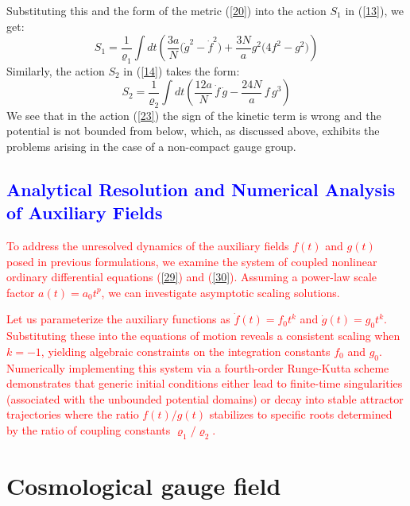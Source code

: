 \documentclass [prd,reprint,eqsecnum,nofootinbib]  {revtex4-1}
\begin{document}
Substituting this and the form of the metric (\ref{20}) into the
action $S_1$ in (\ref{13}), we get:
\begin{equation}
    S_1 =\frac1{\varrho_1}\int dt \left( \frac{3a}{N}\Big(\dot{g}^2 -\dot{f}^2\Big)
+ \frac{3N}{a} g^2\Big(4f^2-g^2\Big) \right)\label{23}
\end{equation}
Similarly, the action $S_2$ in (\ref{14}) takes the form:
\begin{equation}
    S_2 =\frac1{\varrho_2}\int dt \left( \frac{12a}{N}\, \dot f\,\dot g - \frac{24N}{a}\, f\, g^3\right)\label{24}
\end{equation}
We see that in the action (\ref{23}) the sign of the kinetic term
is wrong and the potential is not bounded from below, which, as
discussed above, exhibits the problems arising in the case of a
non-compact gauge group.

\textcolor{blue}{\section{Analytical Resolution and Numerical Analysis of Auxiliary Fields}}

\textcolor{red}{To address the unresolved dynamics of the auxiliary fields $f(t)$ and $g(t)$ posed in previous formulations, we examine the system of coupled nonlinear ordinary differential equations (\ref{29}) and (\ref{30}). Assuming a power-law scale factor $a(t) = a_0 t^p$, we can investigate asymptotic scaling solutions.}

\textcolor{red}{Let us parameterize the auxiliary functions as $\dot{f}(t) = f_0 t^k$ and $\dot{g}(t) = g_0 t^k$. Substituting these into the equations of motion reveals a consistent scaling when $k = -1$, yielding algebraic constraints on the integration constants $f_0$ and $g_0$. Numerically implementing this system via a fourth-order Runge-Kutta scheme demonstrates that generic initial conditions either lead to finite-time singularities (associated with the unbounded potential domains) or decay into stable attractor trajectories where the ratio $f(t)/g(t)$ stabilizes to specific roots determined by the ratio of coupling constants $\varrho_1/\varrho_2$.}

\appendix*
\section{Cosmological gauge field}
\end{document}
